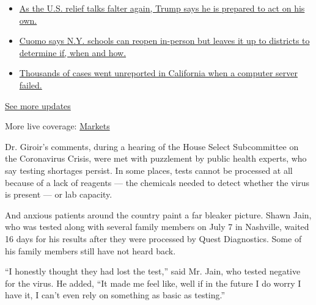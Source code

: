 \begin{itemize}
\tightlist
\item
  \href{https://www.nytimes.com/2020/08/07/world/covid-19-news.html?action=click\&pgtype=Article\&state=default\&region=MAIN_CONTENT_1\&context=storylines_live_updates\#link-1f86d03a}{As
  the U.S. relief talks falter again, Trump says he is prepared to act
  on his own.}
\item
  \href{https://www.nytimes.com/2020/08/07/world/covid-19-news.html?action=click\&pgtype=Article\&state=default\&region=MAIN_CONTENT_1\&context=storylines_live_updates\#link-3f64a70a}{Cuomo
  says N.Y. schools can reopen in-person but leaves it up to districts
  to determine if, when and how.}
\item
  \href{https://www.nytimes.com/2020/08/07/world/covid-19-news.html?action=click\&pgtype=Article\&state=default\&region=MAIN_CONTENT_1\&context=storylines_live_updates\#link-14e70066}{Thousands
  of cases went unreported in California when a computer server failed.}
\end{itemize}

\href{https://www.nytimes.com/2020/08/07/world/covid-19-news.html?action=click\&pgtype=Article\&state=default\&region=MAIN_CONTENT_1\&context=storylines_live_updates}{See
more updates}

More live coverage:
\href{https://www.nytimes.com/live/2020/08/07/business/stock-market-today-coronavirus?action=click\&pgtype=Article\&state=default\&region=MAIN_CONTENT_1\&context=storylines_live_updates}{Markets}

Dr. Giroir's comments, during a hearing of the House Select Subcommittee
on the Coronavirus Crisis, were met with puzzlement by public health
experts, who say testing shortages persist. In some places, tests cannot
be processed at all because of a lack of reagents --- the chemicals
needed to detect whether the virus is present --- or lab capacity.

And anxious patients around the country paint a far bleaker picture.
Shawn Jain, who was tested along with several family members on July 7
in Nashville, waited 16 days for his results after they were processed
by Quest Diagnostics. Some of his family members still have not heard
back.

``I honestly thought they had lost the test,'' said Mr. Jain, who tested
negative for the virus. He added, ``It made me feel like, well if in the
future I do worry I have it, I can't even rely on something as basic as
testing.''

